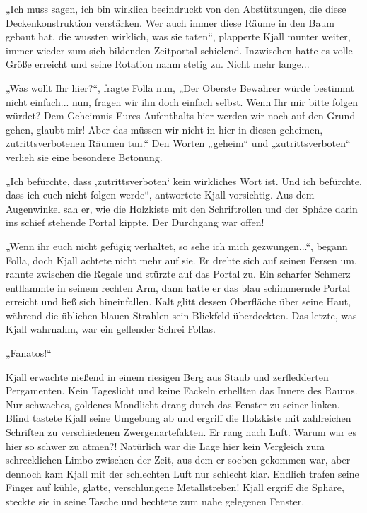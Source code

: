 „Ich muss sagen, ich bin wirklich beeindruckt von den Abstützungen, die diese Deckenkonstruktion verstärken. Wer auch immer diese Räume in den Baum gebaut hat, die wussten wirklich, was sie taten“, plapperte Kjall munter weiter, immer wieder zum sich bildenden Zeitportal schielend. Inzwischen hatte es volle Größe erreicht und seine Rotation nahm stetig zu. Nicht mehr lange...

„Was wollt Ihr hier?“, fragte Folla nun, „Der Oberste Bewahrer würde bestimmt nicht einfach... nun, fragen wir ihn doch einfach selbst. Wenn Ihr mir bitte folgen würdet? Dem Geheimnis Eures Aufenthalts hier werden wir noch auf den Grund gehen, glaubt mir! Aber das müssen wir nicht in hier in diesen geheimen, zutrittsverbotenen Räumen tun.“ Den Worten „geheim“ und „zutrittsverboten“ verlieh sie eine besondere Betonung.

„Ich befürchte, dass ‚zutrittsverboten‘ kein wirkliches Wort ist. Und ich befürchte, dass ich euch nicht folgen werde“, antwortete Kjall vorsichtig. Aus dem Augenwinkel sah er, wie die Holzkiste mit den Schriftrollen und der Sphäre darin ins schief stehende Portal kippte. Der Durchgang war offen!

„Wenn ihr euch nicht gefügig verhaltet, so sehe ich mich gezwungen...“, begann Folla, doch Kjall achtete nicht mehr auf sie. Er drehte sich auf seinen Fersen um, rannte zwischen die Regale und stürzte auf das Portal zu. Ein scharfer Schmerz entflammte in seinem rechten Arm, dann hatte er das blau schimmernde Portal erreicht und ließ sich hineinfallen. Kalt glitt dessen Oberfläche über seine Haut, während die üblichen blauen Strahlen sein Blickfeld überdeckten. Das letzte, was Kjall wahrnahm, war ein gellender Schrei Follas.

„Fanatos!“\bigskip




Kjall erwachte nießend in einem riesigen Berg aus Staub und zerfledderten Pergamenten. Kein Tageslicht und keine Fackeln erhellten das Innere des Raums. Nur schwaches, goldenes Mondlicht drang durch das Fenster zu seiner linken. Blind tastete Kjall seine Umgebung ab und ergriff die Holzkiste mit zahlreichen Schriften zu verschiedenen Zwergenartefakten. Er rang nach Luft. Warum war es hier so schwer zu atmen?! Natürlich war die Lage hier kein Vergleich zum schrecklichen Limbo zwischen der Zeit, aus dem er soeben gekommen war, aber dennoch kam Kjall mit der schlechten Luft nur schlecht klar. Endlich trafen seine Finger auf kühle, glatte, verschlungene Metallstreben! Kjall ergriff die Sphäre, steckte sie in seine Tasche und hechtete zum nahe gelegenen Fenster.


